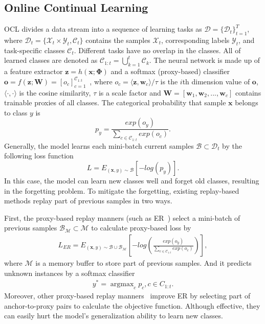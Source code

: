\subsection{Online Continual Learning} 
OCL divides a data stream into a sequence of learning tasks as $\mathcal{D}=\{\mathcal{D}_t\}_{t=1}^T$, where $\mathcal{D}_t=\{\mathcal{X}_t\times \mathcal{Y}_t,\mathcal{C}_t\}$ contains the samples $\mathcal{X}_t$, corresponding labels $\mathcal{Y}_t$, and task-specific classes $\mathcal{C}_t$. Different tasks have no overlap in the classes. All of learned classes are denoted as $\mathcal{C}_{1:t}=\bigcup_{k=1}^t \mathcal{C}_k$. The neural network is made up of a feature extractor $\bm{z}=h(\bm{x};\bm{\Phi})$ and a softmax (proxy-based) classifier $\bm{o}=f(\bm{z};\bm{W})=[o_c]_{c=1}^{\mathcal{C}_{1:t}}$~\cite{hou2019learning}, where $o_c=\langle\bm{z},\bm{w}_c\rangle/\tau$ is the $i$th dimension value of $\bm{o}$, $\langle\cdot,\cdot\rangle$ is the cosine similarity, $\tau$ is a scale factor and $\bm{W}=[\bm{w}_1,\bm{w}_2,...,\bm{w}_c]$ contains trainable proxies of all classes. The categorical probability that sample $\bm{x}$ belongs to class $y$ is
\begin{equation}
    \label{eq:probability}
	p_y=\frac{exp(o_y)}{\sum_{c\in\mathcal{C}_{1:t}}exp(o_c)}.
\end{equation}
Generally, the model learns each mini-batch current samples ${\mathcal{B}\subset\mathcal{D}_t}$ by the following loss function
\begin{equation}
    \label{eq:oclloss}
	L=E_{(\bm{x},y)\sim{\mathcal{B}}}[-log(p_y)].
\end{equation}
In this case, the model can learn new classes well and forget old classes, resulting in the forgetting problem. To mitigate the forgetting, existing replay-based methods replay part of previous samples in two ways.

First, the proxy-based replay manners (such as ER~\cite{rolnick2019experience}) select a mini-batch of previous samples $\mathcal{B}_\mathcal{M}\subset\mathcal{M}$ to calculate proxy-based loss by
\begin{equation}
\label{eq:erloss}
\begin{split}
L_{ER}=E_{(\bm{x},y)\sim{\mathcal{B}\cup\mathcal{B}_\mathcal{M}}}[-log(\frac{exp(o_y)}{\sum_{c\in{\mathcal{C}_{1:t}}}exp(o_c)})],
\end{split}
\end{equation}
where $\mathcal{M}$ is a memory buffer to store part of previous samples. And it predicts unknown instances by a softmax classifier  
\begin{equation}
\label{eq:test}
 	\begin{split}
	 	y^* = \mathop{\arg\max}_{c}p_c,c\in C_{1:t}.
 	\end{split}
\end{equation}
Moreover, other proxy-based replay manners~\cite{ahn2021ss,caccia2021new} improve ER by selecting part of anchor-to-proxy pairs to calculate the objective function. Although effective, they can easily hurt the model's generalization ability to learn new classes.

